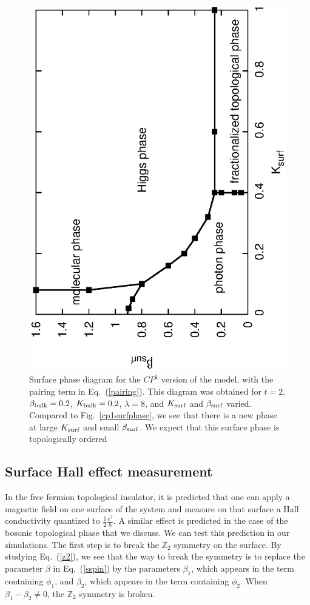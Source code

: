 \documentclass[prb,twocolumn]{revtex4-1}
\begin{document}
\begin{figure}
\includegraphics[angle=-90,width=0.9\linewidth]{figures/cp1surfacepairing.eps}
\caption{Surface phase diagram for the $CP^1$ version of the model, with the pairing term in Eq.~(\ref{pairing}). This diagram was obtained for $t=2$, $\beta_{\rm bulk}=0.2$, $K_{\rm bulk}=0.2$, $\lambda=8$, and $K_{\rm surf}$ and $\beta_{\rm surf}$ varied. Compared to Fig.~\ref{cp1surfphase}, we see that there is a new phase at large $K_{\rm surf}$ and small $\beta_{\rm surf}$. We expect that this surface phase is topologically ordered  }
\label{cp1surfpair}
\end{figure}

\subsection{Surface Hall effect measurement}

In the free fermion topological insulator, it is predicted that one can apply a magnetic field on one surface of the system and measure on that surface a Hall conductivity quantized to $\frac{1}{2}\frac{e^2}{h}$. A similar effect is predicted in the case of the bosonic topological phase that we discuss.\cite{SenthilVishwanath} We can test this prediction in our simulations. The first step is to break the $\mathbb{Z}_2$ symmetry on the surface. By studying Eq.~(\ref{z2}), we see that the way to break the symmetry is to replace the parameter $\beta$ in Eq.~(\ref{sspin}) by the parameters $\beta_1$, which appears in the term containing $\phi_1$, and $\beta_2$, which appears in the term containing $\phi_2$. When $\beta_1-\beta_2\neq 0$, the $\mathbb{Z}_2$ symmetry is broken.
\end{document}
